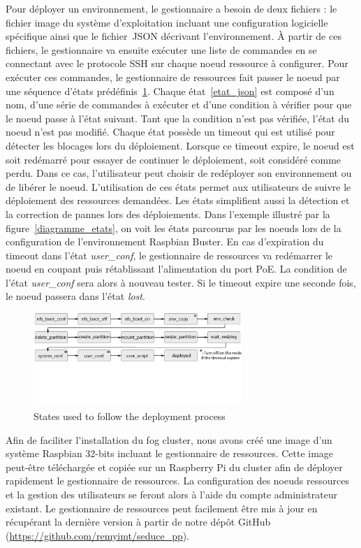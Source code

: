 \documentclass[letterpaper, 10 pt, conference]{ieeeconf}
\begin{document}
Pour déployer un environnement, le gestionnaire a besoin de deux fichiers : le fichier image du système d'exploitation incluant une configuration logicielle spécifique ainsi que le fichier~JSON décrivant l'environnement. À partir de ces fichiers, le gestionnaire va ensuite exécuter une liste de commandes en se connectant avec le protocole SSH sur chaque noeud ressource à configurer. Pour exécuter ces commandes, le gestionnaire de ressources fait passer le noeud par une séquence d'états prédéfinis~\ref{fig:states}. Chaque état~\ref{etat_json} est composé d'un nom, d'une série de commandes à exécuter et d'une condition à vérifier pour que le noeud passe à l'état suivant. Tant que la condition n'est pas vérifiée, l'état du noeud n'est pas modifié. Chaque état possède un timeout qui est utilisé pour détecter les blocages lors du déploiement. Lorsque ce timeout expire, le noeud est soit redémarré pour essayer de continuer le déploiement, soit considéré comme perdu. Dans ce cas, l'utilisateur peut choisir de redéployer son environnement ou de libérer le noeud. L'utilisation de ces états permet aux utilisateurs de suivre le déploiement des ressources demandées. Les états simplifient aussi la détection et la correction de pannes lors des déploiements. Dans l'exemple illustré par la figure~\ref{diagramme_etats}, on voit les états parcourus par les noeuds lors de la configuration de l'environnement Raspbian Buster. En cas d'expiration du timeout dans l'état \textit{user\_conf}, le gestionnaire de ressources va redémarrer le noeud en coupant puis rétablissant l'alimentation du port PoE. La condition de l'état \textit{user\_conf} sera alors à nouveau tester. Si le timeout expire une seconde fois, le noeud passera dans l'état \textit{lost}.

\begin{figure}[htb]
  \includegraphics[width=\linewidth, height=100pt]{img/states.png}
  \caption{States used to follow the deployment process}
  \label{fig:states}
\end{figure}

Afin de faciliter l'installation du fog cluster, nous avons créé une image d'un système Raspbian 32-bits incluant le gestionnaire de ressources. Cette image peut-être téléchargée et copiée sur un Raspberry Pi du cluster afin de déployer rapidement le gestionnaire de ressources. La configuration des noeuds ressources et la gestion des utilisateurs se feront alors à l'aide du compte administrateur existant. Le gestionnaire de ressources peut facilement être mis à jour en récupérant la dernière version à partir de notre dépôt GitHub (\url{https://github.com/remyimt/seduce\_pp}).
\end{document}

